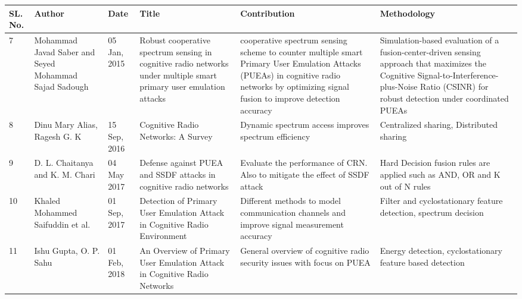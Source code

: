 \begin{table}[]
    \centering
\begin{tabular}{|p{0.5cm}|p{2.5cm}|p{1.1cm}|p{2.8cm}|p{2.8cm}|p{2.8cm}|}
\hline
\textbf{SL. No.} & \textbf{Author} & \textbf{Date} & \textbf{Title} & \textbf{Contribution} & \textbf{Methodology} \\
\hline
7 & Mohammad Javad Saber and Seyed Mohammad Sajad Sadough & 05 Jan, 2015 & Robust cooperative spectrum sensing in cognitive radio networks under multiple smart primary user emulation attacks &  cooperative spectrum sensing scheme to counter multiple smart Primary User Emulation Attacks (PUEAs) in cognitive radio networks by optimizing signal fusion to improve detection accuracy & Simulation-based evaluation of a fusion-center-driven sensing approach that maximizes the Cognitive Signal-to-Interference-plus-Noise Ratio (CSINR) for robust detection under coordinated PUEAs \\
\hline
8 & Dinu Mary Alias, Ragesh G. K & 15 Sep, 2016 & Cognitive Radio Networks: A Survey & Dynamic spectrum access improves spectrum efficiency & Centralized sharing, Distributed sharing \\
\hline
9 & D. L. Chaitanya and K. M. Chari & 04 May 2017 & Defense against PUEA and SSDF attacks in cognitive radio networks & Evaluate the performance of CRN. Also to mitigate the effect of SSDF attack & Hard Decision fusion rules are applied such as AND, OR and K out of N rules \\
\hline
10 & Khaled Mohammed Saifuddin et al. & 01 Sep, 2017 & Detection of Primary User Emulation Attack in Cognitive Radio Environment & Different methods to model communication channels and improve signal measurement accuracy & Filter and cyclostationary feature detection, spectrum decision \\
\hline
11 & Ishu Gupta, O. P. Sahu & 01 Feb, 2018 & An Overview of Primary User Emulation Attack in Cognitive Radio Networks & General overview of cognitive radio security issues with focus on PUEA & Energy detection, cyclostationary feature based detection \\
\hline


\end{tabular}
\end{table}
